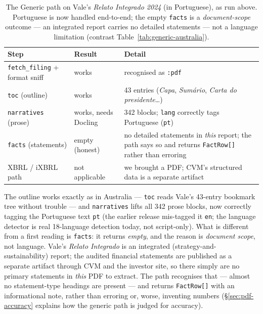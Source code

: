 \documentclass[11pt,a4paper]{report}
\begin{document}
\begin{table}[h]
\centering
\small
\caption{The Generic path on Vale's \emph{Relato Integrado 2024} (in Portuguese), as run above. Portuguese is
now handled end-to-end; the empty \texttt{facts} is a \emph{document-scope} outcome --- an integrated report
carries no detailed statements --- not a language limitation (contrast Table~\ref{tab:generic-australia}).}
\label{tab:generic-brazil}
\begin{tabular}{@{}p{}p{}p{}@{}}
\toprule
\textbf{Step} & \textbf{Result} & \textbf{Detail} \\
\midrule
\texttt{fetch\_filing} + format sniff & works & recognised as \texttt{:pdf} \\
\texttt{toc} (outline) & works & 43 entries (\emph{Capa}, \emph{Sumário}, \emph{Carta do presidente}\ldots) \\
\texttt{narratives} (prose) & works, needs Docling & 342 blocks; \texttt{lang} correctly tags Portuguese (\texttt{pt}) \\
\texttt{facts} (statements) & empty (honest) & no detailed statements in \emph{this} report; the path says so and returns \texttt{FactRow[]} rather than erroring \\
XBRL / iXBRL path & not applicable & we brought a PDF; CVM's structured data is a separate artifact \\
\bottomrule
\end{tabular}
\end{table}

\noindent The outline works exactly as in Australia --- \texttt{toc} reads Vale's 43-entry bookmark tree
without trouble --- and \texttt{narratives} lifts all 342 prose blocks, now correctly tagging the Portuguese
text \texttt{pt} (the earlier release mis-tagged it \texttt{en}; the language detector is real 18-language
detection today, not script-only). What is different from a first reading is \texttt{facts}: it returns
\emph{empty}, and the reason is \emph{document scope}, not language. Vale's \emph{Relato Integrado} is an
integrated (strategy-and-sustainability) report; the audited financial statements are published as a separate
artifact through CVM and the investor site, so there simply are no primary statements in \emph{this} PDF to
extract. The path recognises that --- almost no statement-type headings are present --- and returns
\texttt{FactRow[]} with an informational note, rather than erroring or, worse, inventing numbers
(\S\ref{sec:pdf-accuracy} explains how the generic path is judged for accuracy).
\end{document}
